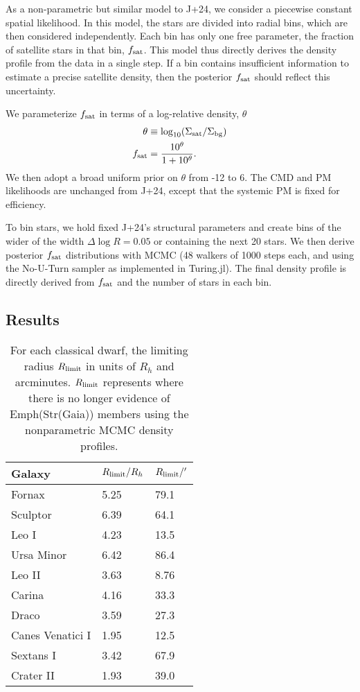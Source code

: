 As a non-parametric but similar model to J+24, we consider a piecewise
constant spatial likelihood. In this model, the stars are divided into
radial bins, which are then considered independently. Each bin has only
one free parameter, the fraction of satellite stars in that bin,
\(f_{\rm sat}\). This model thus directly derives the density profile
from the data in a single step. If a bin contains insufficient
information to estimate a precise satellite density, then the posterior
\(f_{\rm sat}\) should reflect this uncertainty.

We parameterize \(f_{\rm sat}\) in terms of a log-relative density,
\(\theta\) \begin{equation}{
\begin{split}
\theta &\equiv \log_{10}({\Sigma_{\rm sat}}/{\Sigma_{\rm bg}}) \\
f_{\rm sat} &= \frac{10^{\theta}}{1 + 10^{\theta}}.
\end{split}
}\end{equation} We then adopt a broad uniform prior on \(\theta\) from
-12 to 6. The CMD and PM likelihoods are unchanged from J+24, except
that the systemic PM is fixed for efficiency.

To bin stars, we hold fixed J+24's structural parameters and create bins
of the wider of the width \(\Delta \log R=0.05\) or containing the next
20 stars. We then derive posterior \(f_{\rm sat}\) distributions with
MCMC (48 walkers of 1000 steps each, and using the No-U-Turn sampler as
implemented in Turing.jl). The final density profile is directly derived
from \(f_{\rm sat}\) and the number of stars in each bin.

\subsection{Results}\label{results}

\begin{table*}[t]
\centering
\caption[The limiting radii of Gaia-derived density profiles]{For each classical dwarf, the limiting radius $R_{\rm limit}$ in units of $R_h$ and arcminutes. $R_{\rm limit}$ represents where there is no longer evidence of Emph(Str(Gaia)) members using the nonparametric MCMC density profiles. }
\label{tbl:mcmc_props}
\begin{tabular}{lll}
\toprule
Galaxy & $R_{\rm limit} / R_h$ & $R_{\rm limit} / '$\\
\midrule
Fornax & 5.25 & 79.1\\
Sculptor & 6.39 & 64.1\\
Leo I & 4.23 & 13.5\\
Ursa Minor & 6.42 & 86.4\\
Leo II & 3.63 & 8.76\\
Carina & 4.16 & 33.3\\
Draco & 3.59 & 27.3\\
Canes Venatici I & 1.95 & 12.5\\
Sextans I & 3.42 & 67.9\\
Crater II & 1.93 & 39.0\\
\bottomrule
\end{tabular}
\end{table*}

